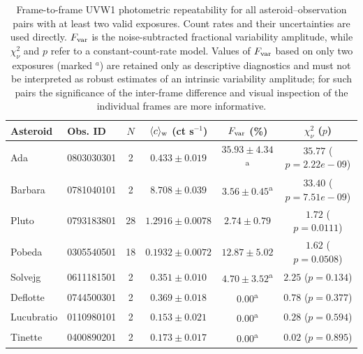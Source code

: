 \begin{table}[t]
\centering
\small
\setlength{\tabcolsep}{5pt}
\renewcommand{\arraystretch}{1.05}
\begin{tabular}{llcccc}
\toprule
Asteroid & Obs. ID & $N$ & $\langle c\rangle_{\rm w}$ (ct s$^{-1}$) & $F_{\rm var}$ (\%) & $\chi^2_\nu$ ($p$) \\
\midrule
Ada & 0803030301 & 2 & $0.433 \pm 0.019$ & $35.93 \pm 4.34$\textsuperscript{a} & $35.77$ ($p=2.22e-09$) \\
Barbara & 0781040101 & 2 & $8.708 \pm 0.039$ & $3.56 \pm 0.45$\textsuperscript{a} & $33.40$ ($p=7.51e-09$) \\
Pluto & 0793183801 & 28 & $1.2916 \pm 0.0078$ & $2.74 \pm 0.79$ & $1.72$ ($p=0.0111$) \\
Pobeda & 0305540501 & 18 & $0.1932 \pm 0.0072$ & $12.87 \pm 5.02$ & $1.62$ ($p=0.0508$) \\
Solvejg & 0611181501 & 2 & $0.351 \pm 0.010$ & $4.70 \pm 3.52$\textsuperscript{a} & $2.25$ ($p=0.134$) \\
Deflotte & 0744500301 & 2 & $0.369 \pm 0.018$ & $0.00$\textsuperscript{a} & $0.78$ ($p=0.377$) \\
Lucubratio & 0110980101 & 2 & $0.153 \pm 0.021$ & $0.00$\textsuperscript{a} & $0.28$ ($p=0.594$) \\
Tinette & 0400890201 & 2 & $0.173 \pm 0.017$ & $0.00$\textsuperscript{a} & $0.02$ ($p=0.895$) \\
\bottomrule
\end{tabular}
\caption{Frame-to-frame UVW1 photometric repeatability for all asteroid--observation pairs with at least two valid exposures. Count rates and their uncertainties are used directly. $F_{\rm var}$ is the noise-subtracted fractional variability amplitude, while $\chi^2_\nu$ and $p$ refer to a constant-count-rate model. Values of $F_{\rm var}$ based on only two exposures (marked $^{a}$) are retained only as descriptive diagnostics and must not be interpreted as robust estimates of an intrinsic variability amplitude; for such pairs the significance of the inter-frame difference and visual inspection of the individual frames are more informative.}
\label{tab:repeated-photometry-variability}
\end{table}
